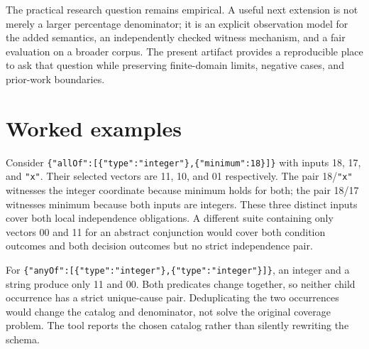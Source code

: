 \documentclass[sigconf,nonacm]{acmart}
\begin{document}
The practical research question remains empirical. A useful next extension is not merely a larger percentage denominator; it is an explicit observation model for the added semantics, an independently checked witness mechanism, and a fair evaluation on a broader corpus. The present artifact provides a reproducible place to ask that question while preserving finite-domain limits, negative cases, and prior-work boundaries.

\appendix
\section{Worked examples}
Consider \texttt{\{\allowbreak{}"\allowbreak{}a\allowbreak{}l\allowbreak{}l\allowbreak{}O\allowbreak{}f\allowbreak{}"\allowbreak{}:\allowbreak{}[\allowbreak{}\{\allowbreak{}"\allowbreak{}t\allowbreak{}y\allowbreak{}p\allowbreak{}e\allowbreak{}"\allowbreak{}:\allowbreak{}"\allowbreak{}i\allowbreak{}n\allowbreak{}t\allowbreak{}e\allowbreak{}g\allowbreak{}e\allowbreak{}r\allowbreak{}"\allowbreak{}\}\allowbreak{},\allowbreak{}\{\allowbreak{}"\allowbreak{}m\allowbreak{}i\allowbreak{}n\allowbreak{}i\allowbreak{}m\allowbreak{}u\allowbreak{}m\allowbreak{}"\allowbreak{}:\allowbreak{}1\allowbreak{}8\allowbreak{}\}\allowbreak{}]\allowbreak{}\}} with inputs 18, 17, and \texttt{"\allowbreak{}x\allowbreak{}"}. Their selected vectors are 11, 10, and 01 respectively. The pair 18/\texttt{"\allowbreak{}x\allowbreak{}"} witnesses the integer coordinate because minimum holds for both; the pair 18/17 witnesses minimum because both inputs are integers. These three distinct inputs cover both local independence obligations. A different suite containing only vectors 00 and 11 for an abstract conjunction would cover both condition outcomes and both decision outcomes but no strict independence pair.

For \texttt{\{\allowbreak{}"\allowbreak{}a\allowbreak{}n\allowbreak{}y\allowbreak{}O\allowbreak{}f\allowbreak{}"\allowbreak{}:\allowbreak{}[\allowbreak{}\{\allowbreak{}"\allowbreak{}t\allowbreak{}y\allowbreak{}p\allowbreak{}e\allowbreak{}"\allowbreak{}:\allowbreak{}"\allowbreak{}i\allowbreak{}n\allowbreak{}t\allowbreak{}e\allowbreak{}g\allowbreak{}e\allowbreak{}r\allowbreak{}"\allowbreak{}\}\allowbreak{},\allowbreak{}\{\allowbreak{}"\allowbreak{}t\allowbreak{}y\allowbreak{}p\allowbreak{}e\allowbreak{}"\allowbreak{}:\allowbreak{}"\allowbreak{}i\allowbreak{}n\allowbreak{}t\allowbreak{}e\allowbreak{}g\allowbreak{}e\allowbreak{}r\allowbreak{}"\allowbreak{}\}\allowbreak{}]\allowbreak{}\}}, an integer and a string produce only 11 and 00. Both predicates change together, so neither child occurrence has a strict unique-cause pair. Deduplicating the two occurrences would change the catalog and denominator, not solve the original coverage problem. The tool reports the chosen catalog rather than silently rewriting the schema.
\end{document}
